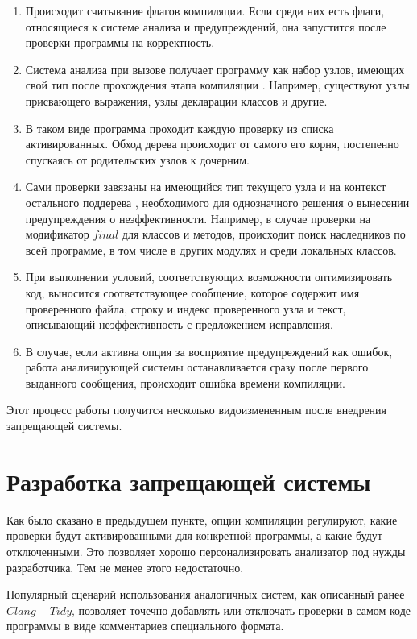 \documentclass{mipt-thesis-bs}
\begin{document}
\begin{enumerate}
    \item Происходит считывание флагов компиляции. Если среди них есть флаги, относящиеся к
    системе анализа и предупреждений, она запустится после проверки программы на корректность.
    \item Система анализа при вызове получает программу как набор узлов, имеющих свой тип после
    прохождения этапа компиляции \cite{pierce}. Например, существуют узлы присвающего выражения, узлы
    декларации классов и другие.
    \item В таком виде программа проходит каждую проверку из списка активированных. Обход
    дерева происходит от самого его корня, постепенно спускаясь от родительских узлов к дочерним.
    \item Сами проверки завязаны на имеющийся тип текущего узла и на контекст остального
    поддерева \cite{pierce}, необходимого для однозначного решения о вынесении предупреждения о неэффективности.
    Например, в случае проверки на модификатор $final$ для классов и методов, происходит поиск
    наследников по всей программе, в том числе в других модулях и среди локальных классов.
    \item При выполнении условий, соответствующих возможности оптимизировать код, выносится
    соответствующее сообщение, которое содержит имя проверенного файла, строку и индекс
    проверенного узла и текст, описывающий неэффективность с предложением исправления.
    \item В случае, если активна опция за восприятие предупреждений как ошибок, работа
    анализирующей системы останавливается сразу после первого выданного сообщения, происходит
    ошибка времени компиляции.
\end{enumerate}

Этот процесс работы получится несколько видоизмененным после внедрения запрещающей системы.

\section{Разработка запрещающей системы}

Как было сказано в предыдущем пункте, опции компиляции регулируют, какие проверки будут
активированными для конкретной программы, а какие будут отключенными. Это позволяет хорошо
персонализировать анализатор под нужды разработчика. Тем не менее этого недостаточно.

Популярный сценарий использования аналогичных систем, как описанный ранее $Clang-Tidy$,
позволяет точечно добавлять или отключать проверки в самом коде программы в виде
комментариев специального формата.
\end{document}
